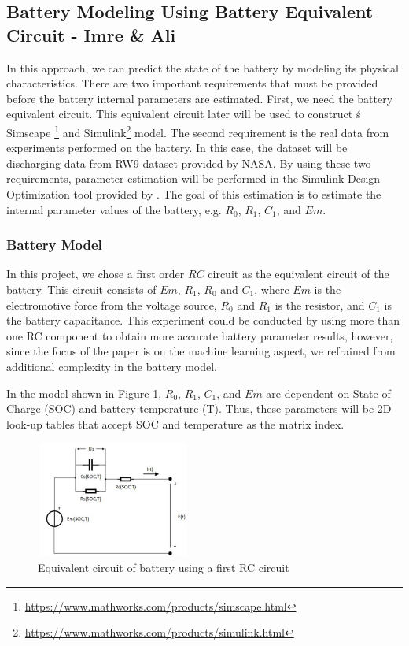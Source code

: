 \subsection{Battery Modeling Using Battery Equivalent Circuit - Imre \& Ali}

In this approach, we can predict the state of the battery by modeling its physical characteristics. There are two important requirements that must be provided before the battery internal parameters are estimated. First, we need the battery equivalent circuit. This equivalent circuit later will be used to construct \MATLAB\'s Simscape \footnote{\url{https://www.mathworks.com/products/simscape.html}} and Simulink\footnote{\url{https://www.mathworks.com/products/simulink.html}} model. The second requirement is the real data from experiments performed on the battery. In this case, the dataset will be discharging data from RW9 dataset provided by NASA. By using these two requirements, parameter estimation will be performed in the Simulink Design Optimization tool provided by \MATLAB. The goal of this estimation is to estimate the internal parameter values of the battery, e.g. $R_0$, $R_1$, $C_1$, and $Em$.

\subsubsection{Battery Model}

In this project, we chose a first order $RC$ circuit as the equivalent circuit of the battery. This circuit consists of $Em$, $R_1$, $R_0$ and $C_1$, where $Em$ is the electromotive force from the voltage source, $R_0$ and $R_1$ is the resistor, and $C_1$ is the battery capacitance. This experiment could be conducted by using more than one RC component to obtain more accurate battery parameter results, however, since the focus of the paper is on the machine learning aspect, we refrained from additional complexity in the battery model.



In the model shown in Figure \ref{fig:circuit_RC}, $R_0$, $R_1$, $C_1$, and $Em$ are dependent on State of Charge (SOC) and battery temperature (T). Thus, these parameters will be 2D look-up tables that accept SOC and temperature as the matrix index. 

\begin{figure}
 \includegraphics[height=1.5in, width=2in]{figures/Circuit_RC}
\caption{Equivalent circuit of battery using a first RC circuit}
\label{fig:circuit_RC}
\end{figure}



